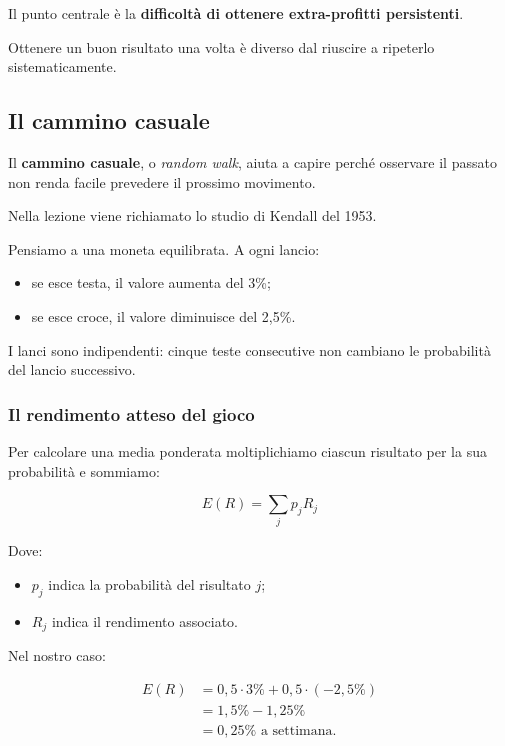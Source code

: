 \noindent Il punto centrale è la
\textbf{difficoltà di ottenere extra-profitti persistenti}.

\noindent Ottenere un buon risultato una volta
è diverso dal riuscire a ripeterlo sistematicamente.


\subsection{Il cammino casuale}

\noindent Il \textbf{cammino casuale},
o \textit{random walk},
aiuta a capire perché osservare il passato
non renda facile prevedere il prossimo movimento.

\noindent Nella lezione viene richiamato
lo studio di Kendall del 1953.

\medskip

\noindent Pensiamo a una moneta equilibrata.
A ogni lancio:

\begin{itemize}
    \item se esce testa, il valore aumenta del 3\%;
    \item se esce croce, il valore diminuisce del 2,5\%.
\end{itemize}

\noindent I lanci sono indipendenti:
cinque teste consecutive non cambiano
le probabilità del lancio successivo.


\subsubsection*{Il rendimento atteso del gioco}

\noindent Per calcolare una media ponderata
moltiplichiamo ciascun risultato
per la sua probabilità e sommiamo:

\[
\boxed{
E(R)=\sum_j p_jR_j
}
\]

\noindent Dove:

\begin{itemize}
    \item $p_j$ indica la probabilità del risultato $j$;
    \item $R_j$ indica il rendimento associato.
\end{itemize}

\noindent Nel nostro caso:

\[
\begin{aligned}
E(R)
&=0{,}5\cdot3\%
+0{,}5\cdot(-2{,}5\%)\\
&=1{,}5\%-1{,}25\%\\
&=\boxed{0{,}25\%\text{ a settimana}}.
\end{aligned}
\]

